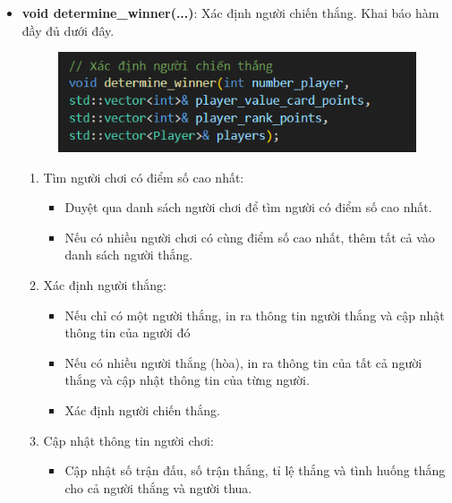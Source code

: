 \documentclass{article}
\begin{document}
\begin{itemize}
    \item \textbf{void determine\_winner(...)}: Xác định người chiến thắng. Khai báo hàm đầy đủ dưới đây.
    \begin{figure}[h!]
        \centering
        \includegraphics[width=1\textwidth]{images/screenshot/det_winner.png}
    \end{figure}

    \begin{description}
            \begin{enumerate}
            \item Tìm người chơi có điểm số cao nhất:
                \begin{itemize}
                    \item Duyệt qua danh sách người chơi để tìm người có điểm số cao nhất.
                    \item Nếu có nhiều người chơi có cùng điểm số cao nhất, thêm tất cả vào danh sách người thắng.
                \end{itemize}
            \item Xác định người thắng:
                \begin{itemize}
                    \item Nếu chỉ có một người thắng, in ra thông tin người thắng và cập nhật thông tin của người đó
                    \item Nếu có nhiều người thắng (hòa), in ra thông tin của tất cả người thắng và cập nhật thông tin của từng người.
                    \item Xác định người chiến thắng.
                \end{itemize}
            \item Cập nhật thông tin người chơi:
                \begin{itemize}
                    \item Cập nhật số trận đấu, số trận thắng, tỉ lệ thắng và tình huống thắng cho cả người thắng và người thua.
                \end{itemize}
        \end{enumerate}
    \end{description}
\end{itemize}
\end{document}
